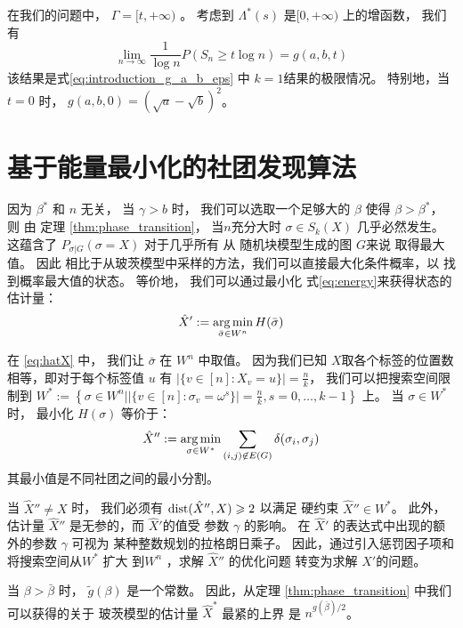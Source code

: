 在我们的问题中， $\Gamma=[t, +\infty)$ 。
考虑到 $\Lambda^*(s)$  是$[0,+\infty)$ 上的增函数，
我们有
\begin{equation}
  \lim_{n\to \infty} \frac{1}{\log n} P(S_n \ge t \log n)
  = g(a,b,t)
\end{equation}
该结果是式\eqref{eq:introduction_g_a_b_eps} 中 $k=1$结果的极限情况。
特别地，当$t=0$ 时， $g(a,b, 0) = \left(\sqrt{a} - \sqrt{b}\right)^2$。

\section{基于能量最小化的社团发现算法}\label{sec:em}
因为 $\beta^*$ 和 $n$ 无关，
当 $\gamma>b$ 时，
我们可以选取一个足够大的 $\beta$ 使得
$\beta > \beta^*$，
则 由 定理 \ref{thm:phase_transition}，
当$n$充分大时 $\sigma \in S_k(X)$ 几乎必然发生。
这蕴含了 $P_{\sigma | G}(\sigma = X)$
对于几乎所有 从 随机块模型生成的图  $G$来说 取得最大值。
因此
相比于从玻茨模型中采样的方法，我们可以直接最大化条件概率，以
找到概率最大值的状态。
等价地， 我们可以通过最小化 式\eqref{eq:energy}来获得状态的估计量：
\begin{equation}\label{eq:hatX}
\hat{X}' := \operatorname*{arg\,min}_{\bar{\sigma} \in W^n} H(\bar{\sigma})
\end{equation}

在 \eqref{eq:hatX} 中， 我们让 $\bar{\sigma}$ 在 $W^n$ 中取值。
因为我们已知 $X$取各个标签的位置数相等，即对于每个标签值 $u$
有 $|\{v \in [n] : X_v = u\}| = \frac{n}{k}$，
我们可以把搜索空间限制到
$W^*:= \left\{\sigma\in W^n \Big\vert |\{v \in [n] : \sigma_v = \omega^s\}| = \frac{n}{k}, s=0,\dots, k-1 \right\}$
上。
当 $\sigma \in W^*$ 时， 最小化 $H(\sigma)$ 等价于：
\begin{equation}\label{eq:hatX_double_prime}
\hat{X}'' := \operatorname*{arg\,min}_{\sigma \in W^*} \sum_{(i,j) \not\in E(G) } \delta(\sigma_i, \sigma_j)
\end{equation}
其最小值是不同社团之间的最小分割。

当 $\hat{X}'' \neq X$ 时，
我们必须有  $\operatorname{dist}(\hat{X}'' ,X)\geqslant 2$
以满足 硬约束 $\hat{X}'' \in W^*$。
此外，估计量 $\hat{X}''$ 是无参的，而 $\hat{X}'$的值受
参数 $\gamma$ 的影响。
在
$\hat{X}'$ 的表达式中出现的额外的参数 $\gamma$ 可视为
某种整数规划的拉格朗日乘子。
因此，通过引入惩罚因子项和将搜索空间从$W^*$ 扩大 到$W^n$
，求解 $\hat{X}''$
的优化问题 转变为求解 $\hat{X}'$的问题。

当 $\beta > \bar{\beta}$ 时，
$\tilde{g}(\beta)$ 是一个常数。
因此，从定理 \ref{thm:phase_transition} 中我们可以获得的关于
玻茨模型的估计量 $\hat{X}^*$ 最紧的上界
是  $n^{g(\bar{\beta})/2}$。

